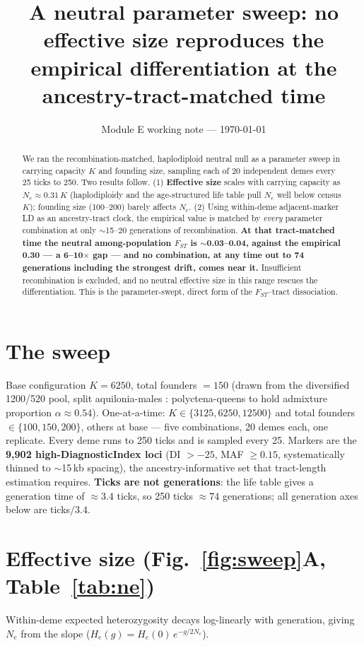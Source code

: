 \documentclass[11pt,a4paper]{article}
\title{A neutral parameter sweep: no effective size reproduces the empirical
differentiation at the ancestry-tract-matched time}
\author{}
\date{Module E working note --- \today}
\begin{document}
\maketitle
\vspace{-2em}

\begin{abstract}\noindent
We ran the recombination-matched, haplodiploid neutral null as a parameter sweep in
carrying capacity $K$ and founding size, sampling each of 20 independent demes every 25
ticks to 250. Two results follow. (1) \textbf{Effective size} scales with carrying
capacity as $N_e \approx 0.31\,K$ (haplodiploidy and the age-structured life table pull
$N_e$ well below census $K$); founding size (100--200) barely affects $N_e$. (2) Using
within-deme adjacent-marker LD as an ancestry-tract clock, the empirical value is matched
by \emph{every} parameter combination at only $\sim$15--20 generations of recombination.
\textbf{At that tract-matched time the neutral among-population $F_{ST}$ is
$\sim$0.03--0.04, against the empirical 0.30 --- a 6--10$\times$ gap --- and no
combination, at any time out to 74 generations including the strongest drift, comes near
it.} Insufficient recombination is excluded, and no neutral effective size in this range
rescues the differentiation. This is the parameter-swept, direct form of the
$F_{ST}$--tract dissociation.
\end{abstract}

\section{The sweep}
Base configuration $K = 6250$, total founders $= 150$ (drawn from the diversified
1200/520 pool, split aquilonia-males : polyctena-queens to hold admixture proportion
$\alpha \approx 0.54$). One-at-a-time: $K \in \{3125, 6250, 12500\}$ and total founders
$\in \{100, 150, 200\}$, others at base --- five combinations, 20 demes each, one
replicate. Every deme runs to 250 ticks and is sampled every 25. Markers are the
\textbf{9{,}902 high-DiagnosticIndex loci} (DI $>-25$, MAF $\ge 0.15$, systematically
thinned to $\sim$15\,kb spacing), the ancestry-informative set that tract-length
estimation requires. \textbf{Ticks are not generations}: the life table gives a
generation time of $\approx 3.4$ ticks, so 250 ticks $\approx 74$ generations; all
generation axes below are ticks$/3.4$.

\section{Effective size (Fig.~\ref{fig:sweep}A, Table~\ref{tab:ne})}
Within-deme expected heterozygosity decays log-linearly with generation, giving $N_e$
from the slope ($H_e(g) = H_e(0)\,e^{-g/2N_e}$).
\end{document}
